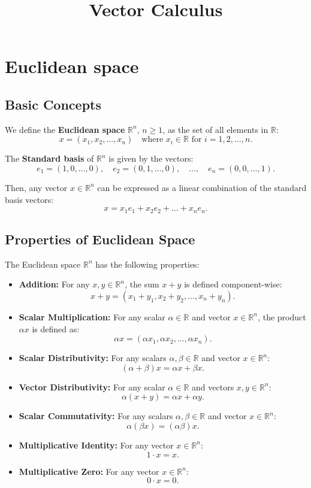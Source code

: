 \documentclass[11pt]{article}
\title{\textbf{Vector Calculus}}
\author{}
\date{}
\begin{document}
\maketitle

\tableofcontents

\pagebreak 

\section{Euclidean space}

\subsection{Basic Concepts}

We define the \textbf{Euclidean space} $\mathbb{R}^n$, $n \geq 1$, as the set of all elements in $\mathbb{R}$:
\[ x = (x_1, x_2, \ldots, x_n) \quad \text{where } x_i \in \mathbb{R} \text{ for } i = 1, 2, \ldots, n. \]

The \textbf{Standard basis} of $\mathbb{R}^n$ is given by the vectors:
\[ e_1 = (1, 0, \ldots, 0), \quad e_2 = (0, 1, \ldots, 0), \quad \ldots, \quad e_n = (0, 0, \ldots, 1). \]

Then, any vector $x \in \mathbb{R}^n$ can be expressed as a linear combination of the standard basis vectors:
\[ x = x_1 e_1 + x_2 e_2 + \ldots + x_n e_n. \]

\subsection{Properties of Euclidean Space}
The Euclidean space $\mathbb{R}^n$ has the following properties:
\begin{itemize}
    \item \textbf{Addition:} For any $x, y \in \mathbb{R}^n$, the sum $x + y$ is defined component-wise:
    \[ x + y = (x_1 + y_1, x_2 + y_2, \ldots, x_n + y_n). \]
    \item \textbf{Scalar Multiplication:} For any scalar $\alpha \in \mathbb{R}$ and vector $x \in \mathbb{R}^n$, the product $\alpha x$ is defined as:
    \[ \alpha x = (\alpha x_1, \alpha x_2, \ldots, \alpha x_n). \]
    \item \textbf{Scalar Distributivity:} For any scalars $\alpha, \beta \in \mathbb{R}$ and vector $x \in \mathbb{R}^n$:
    \[ (\alpha + \beta)x = \alpha x + \beta x. \]
    \item \textbf{Vector Distributivity:} For any scalar $\alpha \in \mathbb{R}$ and vectors $x, y \in \mathbb{R}^n$:
    \[ \alpha(x + y) = \alpha x + \alpha y. \]
    \item \textbf{Scalar Commutativity:} For any scalars $\alpha, \beta \in \mathbb{R}$ and vector $x \in \mathbb{R}^n$:
    \[ \alpha(\beta x) = (\alpha \beta)x. \]
    \item \textbf{Multiplicative Identity:} For any vector $x \in \mathbb{R}^n$:
    \[ 1 \cdot x = x. \]
    \item \textbf{Multiplicative Zero:} For any vector $x \in \mathbb{R}^n$:
    \[ 0 \cdot x = 0. \]
\end{itemize}
\pagebreak
\end{document}
